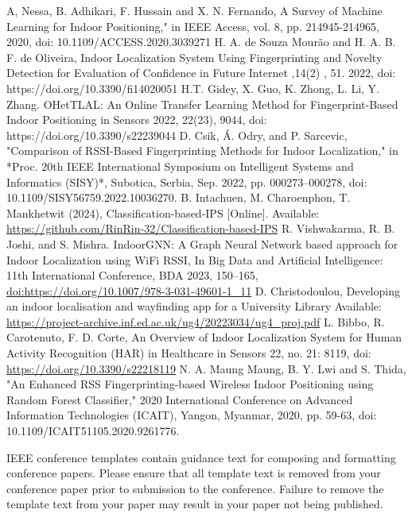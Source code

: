 \documentclass[conference]{IEEEtran}
\begin{document}
	\begin{thebibliography}{00}
		 A, Nessa, B. Adhikari, F. Hussain and X. N. Fernando, A Survey of Machine Learning for Indoor Positioning," in IEEE Access, vol. 8, pp. 214945-214965, 2020, doi: 10.1109/ACCESS.2020.3039271
		 H. A. de Souza Mourão and H. A. B. F. de Oliveira, Indoor Localization System Using Fingerprinting and Novelty Detection for Evaluation of Confidence in Future Internet ,14(2) , 51. 2022, doi:  https://doi.org/10.3390/fi14020051 
		 H.T. Gidey, X. Guo, K. Zhong, L. Li, Y. Zhang. OHetTLAL: An Online Transfer Learning Method for Fingerprint-Based Indoor Positioning in  Sensors 2022, 22(23), 9044, doi: https://doi.org/10.3390/s22239044
		 D. Csik, Á. Odry, and P. Sarcevic, "Comparison of RSSI-Based Fingerprinting Methods for Indoor Localization," in *Proc. 20th IEEE International Symposium on Intelligent Systems and Informatics (SISY)*, Subotica, Serbia, Sep. 2022, pp. 000273–000278, doi: 10.1109/SISY56759.2022.10036270.
		 B. Intachuen, M. Charoenphon, T. Mankhetwit (2024), Classification-based-IPS [Online]. Available: \url{https://github.com/RinRin-32/Classification-based-IPS}
		 R. Vishwakarma, R. B. Joshi, and S. Mishra. IndoorGNN: A Graph Neural Network based approach for Indoor Localization using WiFi RSSI, In Big Data and Artificial Intelligence: 11th International Conference, BDA 2023, 150–165, \url{doi:https://doi.org/10.1007/978-3-031-49601-1_11}
		 D. Christodoulou,  Developing an indoor localisation and wayfinding app for a University Library Available: \url{https://project-archive.inf.ed.ac.uk/ug4/20223034/ug4_proj.pdf}
		 L. Bibbo, R. Carotenuto, F. D. Corte, An Overview of Indoor Localization System for Human Activity Recognition (HAR) in Healthcare in Sensors 22, no. 21: 8119, doi: \url{https://doi.org/10.3390/s22218119}
		N. A. Maung Maung, B. Y. Lwi and S. Thida, "An Enhanced RSS Fingerprinting-based Wireless Indoor Positioning using Random Forest Classifier," 2020 International Conference on Advanced Information Technologies (ICAIT), Yangon, Myanmar, 2020, pp. 59-63, doi: 10.1109/ICAIT51105.2020.9261776.
		
	\end{thebibliography}
	\vspace{12pt}
	\color{red}
	IEEE conference templates contain guidance text for composing and formatting conference papers. Please ensure that all template text is removed from your conference paper prior to submission to the conference. Failure to remove the template text from your paper may result in your paper not being published.
	
\end{document}
